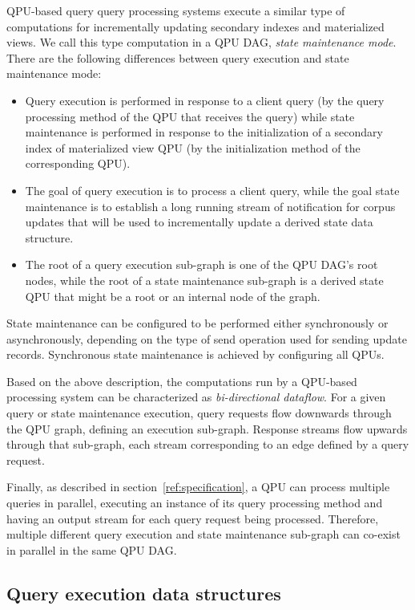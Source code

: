 QPU-based query query processing systems execute a similar type of computations for incrementally updating
secondary indexes and materialized views.
We call this type computation in a QPU DAG, \textit{state maintenance mode}.
There are the following differences between query execution and state maintenance mode:
\begin{itemize}
  \item Query execution is performed in response to a client query (by the query processing method of the QPU that receives the query)
  while state maintenance is performed in response to the initialization of a secondary index of materialized view QPU
  (by the initialization method of the corresponding QPU).
  \item The goal of query execution is to process a client query,
  while the goal state maintenance is to establish a long running stream of notification for corpus updates that
  will be used to incrementally update a derived state data structure.
  \item The root of a query execution sub-graph is one of the QPU DAG's root nodes,
  while the root of a state maintenance sub-graph is a derived state QPU that might be a root or an internal node of the
  graph.
\end{itemize}

State maintenance can be configured to be performed either synchronously or asynchronously, depending on the type of send
operation used for sending update records.
Synchronous state maintenance is achieved by configuring all QPUs.

Based on the above description, the computations run by a QPU-based processing system can be characterized as
\textit{bi-directional dataflow}.
For a given query or state maintenance execution,
query requests flow downwards through the QPU graph, defining an execution sub-graph.
Response streams flow upwards through that sub-graph, each stream corresponding to an edge defined by a query request.

Finally, as described in section~\ref{ref:specification}, a QPU can process multiple queries in parallel,
executing an instance of its query processing method and having an output stream for each query request being processed.
Therefore, multiple different query execution and state maintenance sub-graph can co-exist in parallel in the same QPU DAG.

\subsection{Query execution data structures}


